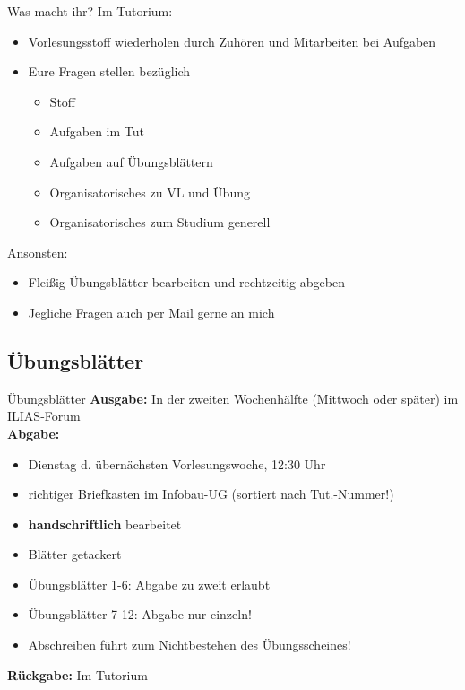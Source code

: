 {		\begin{frame}{Was macht ihr?}
			Im Tutorium:
			\begin{itemize}
				\item Vorlesungsstoff wiederholen durch Zuhören und Mitarbeiten bei Aufgaben
				\item Eure Fragen stellen bezüglich \begin{itemize}
					\item Stoff
					\item Aufgaben im Tut
					\item Aufgaben auf Übungsblättern
					\item Organisatorisches zu VL und Übung
					\item Organisatorisches zum Studium generell
				\end{itemize}
			\end{itemize}
			\pause
			\medskip
			Ansonsten:
			\begin{itemize}
				\item Fleißig Übungsblätter bearbeiten und rechtzeitig abgeben
				\item Jegliche Fragen auch per Mail gerne an mich
			\end{itemize}

		\end{frame}
	}
	
\subsection{Übungsblätter}
	\begin{frame}{Übungsblätter}
		\textbf{Ausgabe:} In der zweiten Wochenhälfte (Mittwoch oder später) im ILIAS-Forum \\
		\pause
		\textbf{Abgabe:}
			\begin{itemize}
				\item Dienstag d. übernächsten Vorlesungswoche, 12:30 Uhr
				\item richtiger Briefkasten im Infobau-UG (sortiert nach Tut.-Nummer!)
				\pause
				\item \textbf{handschriftlich} bearbeitet
				\item Blätter getackert
				\item Übungsblätter 1-6: Abgabe zu zweit erlaubt
				\item Übungsblätter 7-12: Abgabe nur einzeln!
				\item Abschreiben führt zum Nichtbestehen des Übungsscheines!
			\end{itemize}
		\pause	
		\textbf{Rückgabe:} Im Tutorium
	\end{frame}
